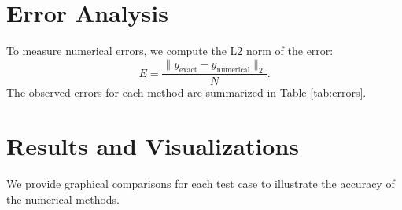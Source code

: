 \documentclass{article}
\begin{document}
\section{Error Analysis}
To measure numerical errors, we compute the L2 norm of the error:
\begin{equation}
    E = \frac{\| y_{\text{exact}} - y_{\text{numerical}} \|_2}{N}.
\end{equation}
The observed errors for each method are summarized in Table \ref{tab:errors}.



\clearpage
\section{Results and Visualizations}
We provide graphical comparisons for each test case to illustrate the accuracy of the numerical methods.
\end{document}
